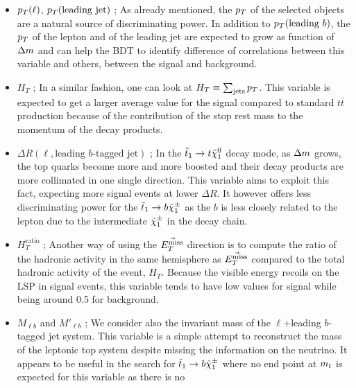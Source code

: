     \begin{itemize}
        \item $p_T(\ell)$, $p_T(\text{leading jet})$ ; As already mentioned, the
            $p_T$ of the selected objects are a natural source of discriminating
            power. In addition to $p_T(\text{leading }b)$, the $p_T$ of the
            lepton and of the leading jet are expected to grow as function of
            $\Delta m$ and can help the BDT to identify difference of
            correlations between this variable and others, between the signal
            and background.
        \item $H_T$ ; In a similar fashion, one can look at $H_T \equiv
            \sum_{\text{jets}} p_T$.  This variable is expected to get a larger
            average value for the signal compared to standard $t\bar{t}$
            production because of the contribution of the stop rest mass to the
            momentum of the decay products.
        \item $\Delta R( \ell, \text{leading } b\text{-tagged jet})$ ; In the
            $\tilde{t}_1 \rightarrow t \tilde{\chi}_1^0$ decay mode, as $\Delta m$ grows,
            the top quarks become more and more boosted and their decay products
            are more collimated in one single direction. This variable aims to
            exploit this fact, expecting more signal events at lower $\Delta R$.
            It however offers less discriminating power for the $\tilde{t}_1
            \rightarrow b \tilde{\chi}_1^\pm$ as the $b$ is less closely related to the
            lepton due to the intermediate $\tilde{\chi}_1^\pm$ in the decay chain.
        \item $H_{T}^\text{ratio}$ ; Another way of using the $\vec{E_T^\text{miss}}$
            direction is to compute the ratio of the hadronic activity in the
            same hemisphere as $\vec{E_T^\text{miss}}$ compared to the total hadronic
            activity of the event, $H_T$. Because the visible energy recoils on
            the LSP in signal events, this variable tends to have low values for
            signal while being around 0.5 for background.
        \item $M_{\ell b}$ and $M'_{\ell b}$ ; We consider also the invariant
            mass of the $\ell$+leading $b$-tagged jet system. This variable is a
            simple attempt to reconstruct the mass of the leptonic top system
            despite missing the information on the neutrino. It appears to be
            useful in the search for $\tilde{t}_1 \rightarrow b \tilde{\chi}_1^\pm$ where no
            end point at $m_{t}$ is expected for this variable as there is no

\end{itemize}
